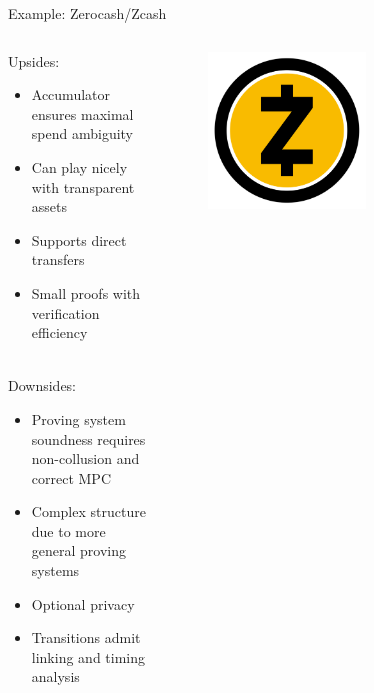 \documentclass[aspectratio=169]{beamer}
\begin{document}
\begin{frame}{Example: Zerocash/Zcash}
\begin{columns}
\begin{column}{0.7\textwidth}
Upsides:
\begin{itemize}
\item Accumulator ensures maximal spend ambiguity
\item Can play nicely with transparent assets
\item Supports direct transfers
\item Small proofs with verification efficiency \\~\\
\end{itemize}

Downsides:
\begin{itemize}
\item Proving system soundness requires non-collusion and correct MPC
\item Complex structure due to more general proving systems
\item Optional privacy
\item Transitions admit linking and timing analysis
\end{itemize}
\end{column}
\begin{column}{0.3\textwidth}
\begin{figure}
\includegraphics[width=0.6\textwidth]{zcash.png}
\end{figure}
\end{column}
\end{columns}
\end{frame}
\end{document}
